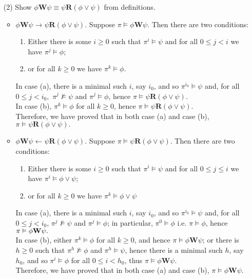 \documentclass{article}
\begin{document}
\begin{enumerate}
    \item [(2)] Show $\phi\textbf{W}\psi\equiv\psi\textbf{R}(\phi\lor\psi)$ from definitions.
    \begin{itemize}
        \item $\phi\textbf{W}\psi\to\psi\textbf{R}(\phi\lor\psi).$ Suppose $\pi\vDash\phi\textbf{W}\psi$. Then there are two conditions:
        \begin{enumerate}
            \item Either there is some $i\ge 0$ such that $\pi^i\vDash\psi$ and for all $0\le j< i$ we have $\pi^j\vDash\phi$;
            \item or for all $k\ge0$ we have $\pi^k\vDash\phi$.
        \end{enumerate}
        In case (a), there is a minimal such $i$, say $i_0$, and so $\pi^{i_0}\vDash\psi$ and, for all $0 \le j < i_0,$ $\pi^j\nvDash\psi$ and $\pi^j\vDash\phi$, hence $\pi\vDash\psi\textbf{R}(\phi\lor\psi).$ \\        
        In case (b), $\pi^k\vDash\phi$ for all $k\ge0$, hence $\pi\vDash\psi\textbf{R}(\phi\lor\psi).$ \\
        Therefore, we have proved that in both case (a) and case (b), $\pi\vDash\psi\textbf{R}(\phi\lor\psi).$
        \item $\phi\textbf{W}\psi\leftarrow\psi\textbf{R}(\phi\lor\psi).$ Suppose $\pi\vDash\psi\textbf{R}(\phi\lor\psi)$. Then there are two conditions:
        \begin{enumerate}
            \item Either there is some $i\ge0$ such that $\pi^i\vDash\psi$ and for all $0\le j\le i$ we have $\pi^i\vDash\phi\lor\psi$;
            \item or for all $k\ge0$ we have $\pi^k\vDash\phi\lor\psi$
        \end{enumerate}
        In case (a), there is a minimal such $i$, say $i_0$, and so $\pi^{i_0}\vDash\psi$ and, for all $0\le j< i_0$, $\pi^j\nvDash\psi$ and $\pi^j\vDash\phi$; in particular, $\pi^0\vDash\phi$ i.e. $\pi\vDash\phi$, hence $\pi\vDash\phi\textbf W\psi.$ \\
        In case (b), either $\pi^k\vDash\phi$ for all $k\ge0$, and hence $\pi\vDash\phi\textbf{W}\psi$; or there is $h\ge0$ such that $\pi^h\nvDash\phi$ and $\pi^h\vDash\psi$, hence there is a minimal such $h$, say $h_0$, and so $\pi^i\vDash\phi$ for all $0\le i<h_0$, thus $\pi\vDash \phi\textbf{W}\psi.$ \\
        Therefore, we have proved that in both case (a) and case (b), $\pi\vDash \phi\textbf{W}\psi.$


\end{itemize}
\end{enumerate}
\end{document}
